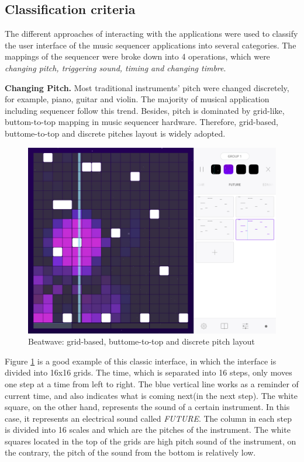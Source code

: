 \subsection{Classification criteria}
\label{sec: classify criteria}
The different approaches of interacting with the applications were used to classify the user interface of the music sequencer applications into several categories. The mappings of the sequencer were broke down into 4 operations,
which were \textit{changing pitch, triggering sound, timing and changing timbre}.

\textbf{Changing Pitch.} Most traditional instruments' pitch were changed discretely, for example, piano, guitar and violin. The majority of musical application including sequencer follow this trend. Besides, pitch is dominated by grid-like, buttom-to-top mapping in music sequencer hardware. Therefore, grid-based, buttome-to-top and discrete pitches layout is widely adopted.

\bigskip
\begin{figure}[h]
  \includegraphics[width=12 cm]{images/Beatwave.PNG}
  \centering
  \caption{Beatwave: grid-based, buttome-to-top and discrete pitch layout}
  \label{fig: Beatwave}
\end{figure}
\bigskip

 Figure \ref{fig: Beatwave} is a good example of this classic interface, in which the interface is divided into 16x16 grids. The time, which is separated into 16 steps, only moves one step at a time from left to right. The blue vertical line works as a reminder of current time, and also indicates what is coming next(in the next step). The white square, on the other hand, represents the sound of a certain instrument. In this case, it represents an electrical sound called \textit{FUTURE}. The column in each step is divided into 16 scales and which are the pitches of the instrument. The white squares located in the top of the grids are high pitch sound of the instrument, on the contrary, the pitch of the sound from the bottom is relatively low.

